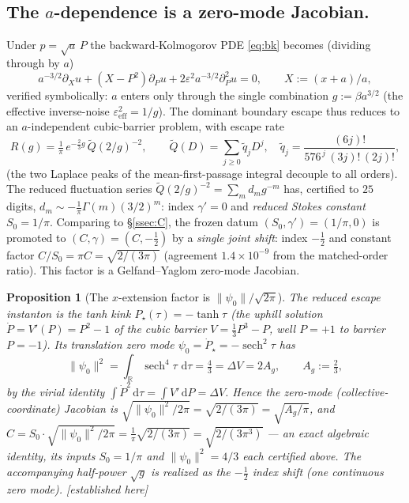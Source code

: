 \documentclass[11pt,reqno]{amsart}
\theoremstyle{plain}
\newtheorem{proposition}[theorem]{Proposition}
\theoremstyle{definition}
\theoremstyle{remark}
\newcommand{\dd}{\,\mathrm{d}}
\newcommand{\R}{\mathbb{R}}
\newcommand{\eps}{\varepsilon}
\newcommand{\sech}{\operatorname{sech}}
\newcommand{\tagPr}{{\footnotesize\textsf{[established here]}}}
\begin{document}
\subsection{The $a$-dependence is a zero-mode Jacobian.}\label{ssec:adep}
Under $p=\sqrt a\,P$ the backward-Kolmogorov PDE \eqref{eq:bk} becomes (dividing through by $a$)
\begin{equation}\label{eq:scaled}
a^{-3/2}\partial_X u+(X-P^2)\partial_P u+2\eps^2 a^{-3/2}\partial_P^2 u=0,\qquad X:=(x+a)/a,
\end{equation}
verified symbolically: $a$ enters only through the single combination $g:=\beta a^{3/2}$ (the
effective inverse-noise $\eps_{\mathrm{eff}}^2=1/g$). The dominant boundary escape thus reduces to an
$a$-independent cubic-barrier problem, with escape rate
\begin{equation}\label{eq:R}
R(g)=\tfrac1\pi\,e^{-\frac23 g}\,\tilde Q(2/g)^{-2},\qquad
\tilde Q(D)=\sum_{j\ge0}\tilde q_j D^j,\quad \tilde q_j=\frac{(6j)!}{576^{\,j}\,(3j)!\,(2j)!},
\end{equation}
(the two Laplace peaks of the mean-first-passage integral decouple to all orders). The reduced
fluctuation series $\tilde Q(2/g)^{-2}=\sum_m d_m g^{-m}$ has, certified to $25$ digits,
$d_m\sim-\tfrac1\pi\Gamma(m)(3/2)^m$: index $\gamma'=0$ and \emph{reduced Stokes constant}
$S_0=1/\pi$. Comparing to \S\ref{ssec:C}, the frozen datum $(S_0,\gamma')=(1/\pi,0)$ is promoted to
$(C,\gamma)=(C,-\tfrac12)$ by a \emph{single joint shift}: index $-\tfrac12$ and constant factor
$C/S_0=\pi C=\sqrt{2/(3\pi)}$ (agreement $1.4\times10^{-9}$ from the matched-order ratio). This factor
is a Gelfand--Yaglom zero-mode Jacobian.

\begin{proposition}[The $x$-extension factor is $\lVert\psi_0\rVert/\sqrt{2\pi}$]\label{prop:gy}
The reduced escape instanton is the tanh kink $P_\star(\tau)=-\tanh\tau$ (the uphill solution
$\dot P=V'(P)=P^2-1$ of the cubic barrier $V=\tfrac13P^3-P$, well $P{=}{+}1$ to barrier $P{=}{-}1$).
Its translation zero mode $\psi_0=\dot P_\star=-\sech^2\tau$ has
\begin{equation}\label{eq:virial}
\lVert\psi_0\rVert^2=\int_\R\sech^4\tau\,\dd\tau=\tfrac43=\Delta V=2A_g,\qquad A_g:=\tfrac23,
\end{equation}
by the virial identity $\int\dot P^2\dd\tau=\int V'\dd P=\Delta V$. Hence the zero-mode
(collective-coordinate) Jacobian is $\sqrt{\lVert\psi_0\rVert^2/2\pi}=\sqrt{2/(3\pi)}=\sqrt{A_g/\pi}$,
and $C=S_0\cdot\sqrt{\lVert\psi_0\rVert^2/2\pi}=\tfrac1\pi\sqrt{2/(3\pi)}=\sqrt{2/(3\pi^3)}$ --- an
exact algebraic identity, its inputs $S_0=1/\pi$ and $\lVert\psi_0\rVert^2=4/3$ each certified above.
The accompanying half-power $\sqrt g$ is realized as the $-\tfrac12$ index shift (one continuous zero
mode). \tagPr
\end{proposition}
\end{document}
